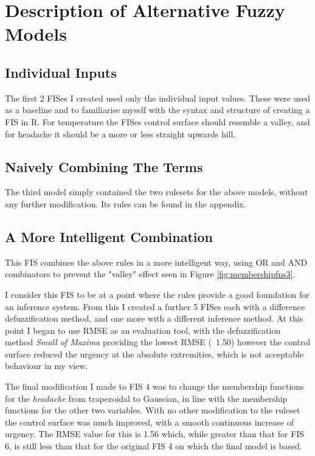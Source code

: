 \documentclass[12pt, a4paper]{report}
\begin{document}
\section{Description of Alternative Fuzzy Models}

\subsection{Individual Inputs}

The first 2 FISes I created used only the individual input values.
These were used as a baseline and to familiarise myself with the syntax and structure of creating a FIS in R.
For temperature the FISes control surface should resemble a valley, and for headache it should be a more or less straight upwards hill.

\subsection{Naively Combining The Terms}
The third model simply contained the two rulesets for the above models, without any further modification.
Its rules can be found in the appendix.

\subsection{A More Intelligent Combination}

This FIS combines the above rules in a more intelligent way, using OR and AND combinators to prevent the "valley" effect seen in Figure \ref{fig:membershipfns3}.

I consider this FIS to be at a point where the rules provide a good foundation for an inference system.
From this I created a further 5 FISes each with a difference defuzzification method, and one more with a different inference method.
At this point I began to use RMSE as an evaluation tool, with the defuzzification method \emph{Small of Maxima} providing the lowest RMSE (~1.50) however the control surface reduced the urgency at the absolute extremities, which is not acceptable behaviour in my view.

\par

The final modification I made to FIS 4 was to change the membership functions for the \textit{headache} from trapezoidal to Gaussian, in line with the membership functions for the other two variables.
With no other modification to the ruleset the control surface was much improved, with a smooth continuous increase of urgency.
The RMSE value for this is 1.56 which, while greater than that for FIS 6, is still less than that for the original FIS 4 on which the final model is based.
\end{document}
